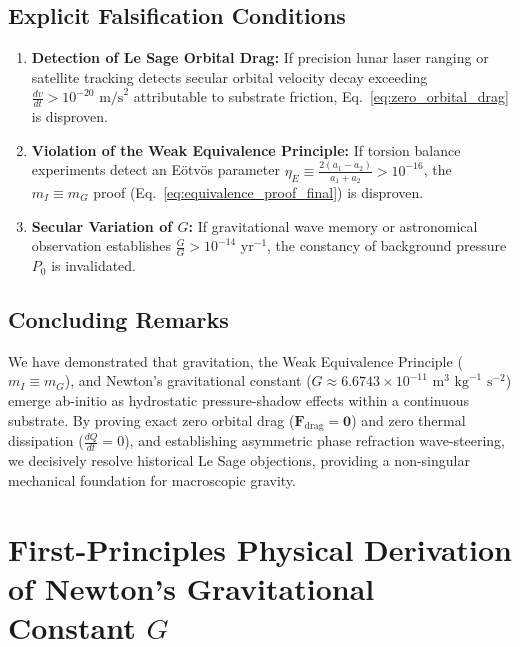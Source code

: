 \documentclass[11pt,a4paper]{article}
\begin{document}
	\subsection{Explicit Falsification Conditions}
	\begin{enumerate}
		\item \textbf{Detection of Le Sage Orbital Drag:} If precision lunar laser ranging or satellite tracking detects secular orbital velocity decay exceeding $\frac{dv}{dt} > 10^{-20} \text{ m/s}^2$ attributable to substrate friction, Eq.\ \eqref{eq:zero_orbital_drag} is disproven.
		\item \textbf{Violation of the Weak Equivalence Principle:} If torsion balance experiments detect an Eötvös parameter $\eta_E \equiv \frac{2(a_1 - a_2)}{a_1 + a_2} > 10^{-16}$, the $m_I \equiv m_G$ proof (Eq.\ \eqref{eq:equivalence_proof_final}) is disproven.
		\item \textbf{Secular Variation of $G$:} If gravitational wave memory or astronomical observation establishes $\frac{\dot{G}}{G} > 10^{-14} \text{ yr}^{-1}$, the constancy of background pressure $P_0$ is invalidated.
	\end{enumerate}
	
	\subsection{Concluding Remarks}
	We have demonstrated that gravitation, the Weak Equivalence Principle ($m_I \equiv m_G$), and Newton's gravitational constant ($G \approx 6.6743 \times 10^{-11} \text{ m}^3\text{ kg}^{-1}\text{ s}^{-2}$) emerge ab-initio as hydrostatic pressure-shadow effects within a continuous substrate. By proving exact zero orbital drag ($\mathbf{F}_{\text{drag}} = \mathbf{0}$) and zero thermal dissipation ($\frac{dQ}{dt} = 0$), and establishing asymmetric phase refraction wave-steering, we decisively resolve historical Le Sage objections, providing a non-singular mechanical foundation for macroscopic gravity.
	
	\appendix
	\section{First-Principles Physical Derivation of Newton's Gravitational Constant $G$}
	\label{app:G_derivation}
	
\end{document}
